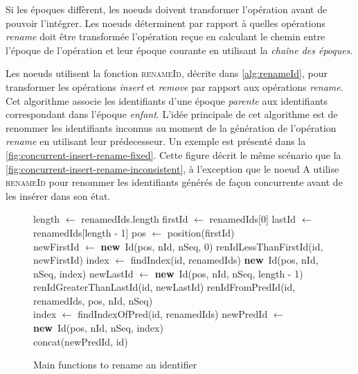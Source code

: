 \documentclass[12pt]{thesul}
\newcommand{\new}{\textbf{new}}
\begin{document}
Si les époques diffèrent, les noeuds doivent transformer l'opération avant de pouvoir l'intégrer.
Les noeuds déterminent par rapport à quelles opérations \emph{rename} doit être transformée l'opération reçue en calculant le chemin entre l'époque de l'opération et leur époque courante en utilisant la \emph{chaîne des époques}.

Les noeuds utilisent la fonction \textsc{renameId}, décrite dans \autoref{alg:renameId}, pour transformer les opérations \emph{insert} et \emph{remove} par rapport aux opérations \emph{rename}.
Cet algorithme associe les identifiants d'une époque \emph{parente} aux identifiants correspondant dans l'époque \emph{enfant}.
L'idée principale de cet algorithme est de renommer les identifiants inconnus au moment de la génération de l'opération \emph{rename} en utilisant leur prédecesseur.
Un exemple est présenté dans la \autoref{fig:concurrent-insert-rename-fixed}.
Cette figure décrit le même scénario que la \autoref{fig:concurrent-insert-rename-inconsistent}, à l'exception que le noeud A utilise \textsc{renameId} pour renommer les identifiants générés de façon concurrente avant de les insérer dans son état.

\begin{figure}[!ht]
  \footnotesize
  \begin{algorithmic}
          \State length $\gets$ renamedIds.length
          \State firstId $\gets$ renamedIds[0]
          \State lastId $\gets$ renamedIds[length - 1]
          \State pos $\gets$ position(firstId)
          \\
              \State newFirstId $\gets$ \new~Id(pos, nId, nSeq, 0)
              \State \Return renIdLessThanFirstId(id, newFirstId)
              \State index $\gets$ findIndex(id, renamedIds)
              \State \Return \new~Id(pos, nId, nSeq, index)
              \State newLastId $\gets$ \new~Id(pos, nId, nSeq, length - 1)
              \State \Return renIdGreaterThanLastId(id, newLastId)
          \Else
              \State \Return renIdFromPredId(id, renamedIds, pos, nId, nSeq)
          \EndIf
      \EndFunction
      \\
          \State index $\gets$ findIndexOfPred(id, renamedIds)
          \State newPredId $\gets$ \new~Id(pos, nId, nSeq, index)
          \\
          \State \Return concat(newPredId, id)
      \EndFunction
  \end{algorithmic}
  \caption{Main functions to rename an identifier}
  \label{alg:renameId}
\end{figure}
\end{document}
